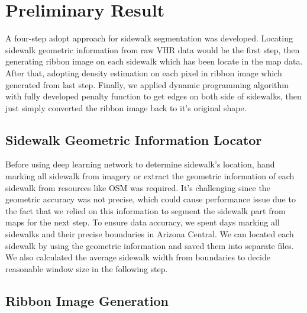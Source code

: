 \chapter{Preliminary Result}

A four-step adopt approach for sidewalk segmentation was developed. Locating sidewalk geometric information from raw \ac{VHR} data would be the first step, then generating ribbon image on each sidewalk which has been locate in the map data. After that, adopting density estimation on each pixel in ribbon image which generated from last step. Finally, we applied dynamic programming algorithm with fully developed penalty function to get edges on both side of sidewalks, then just simply converted the ribbon image back to it's original shape.

\section{Sidewalk Geometric Information Locator}

Before using deep learning network to determine sidewalk's location, hand marking all sidewalk from imagery or extract the geometric information of each sidewalk from resources like \ac{OSM} was required. It's challenging since the geometric accuracy was not precise, which could cause performance issue due to the fact that we relied on this information to segment the sidewalk part from maps for the next step. To ensure data accuracy, we spent days marking all sidewalks and their precise boundaries in Arizona Central. We can located each sidewalk by using the geometric information and saved them into separate files. We also calculated the average sidewalk width from boundaries to decide reasonable window size in the following step.

\section{Ribbon Image Generation}

